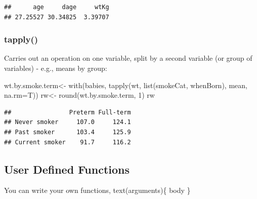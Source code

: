 \documentclass[
]{book}
\newenvironment{Shaded}{\begin{snugshade}}{\end{snugshade}}
\newcommand{\AttributeTok}[1]{\textcolor[rgb]{0.77,0.63,0.00}{#1}}
\newcommand{\ControlFlowTok}[1]{\textcolor[rgb]{0.13,0.29,0.53}{\textbf{#1}}}
\newcommand{\DecValTok}[1]{\textcolor[rgb]{0.00,0.00,0.81}{#1}}
\newcommand{\FunctionTok}[1]{\textcolor[rgb]{0.00,0.00,0.00}{#1}}
\newcommand{\NormalTok}[1]{#1}
\newcommand{\OtherTok}[1]{\textcolor[rgb]{0.56,0.35,0.01}{#1}}
\newcommand{\SpecialCharTok}[1]{\textcolor[rgb]{0.00,0.00,0.00}{#1}}
\newcommand{\StringTok}[1]{\textcolor[rgb]{0.31,0.60,0.02}{#1}}
\begin{document}
\begin{verbatim}
##      age     dage     wtKg 
## 27.25527 30.34825  3.39707
\end{verbatim}

\hypertarget{tapply}{%
\subsubsection*{tapply()}\label{tapply}}

Carries out an operation on one variable, split by a second variable (or group of variables) - e.g., means by group:

\begin{Shaded}
\begin{Highlighting}[]
\NormalTok{wt.by.smoke.term}\OtherTok{\textless{}{-}} \FunctionTok{with}\NormalTok{(babies, }
                       \FunctionTok{tapply}\NormalTok{(wt, }\FunctionTok{list}\NormalTok{(smokeCat, whenBorn), mean, }\AttributeTok{na.rm=}\NormalTok{T))}
\NormalTok{rw}\OtherTok{\textless{}{-}} \FunctionTok{round}\NormalTok{(wt.by.smoke.term, }\DecValTok{1}\NormalTok{)}
\NormalTok{rw}
\end{Highlighting}
\end{Shaded}

\begin{verbatim}
##                Preterm Full-term
## Never smoker     107.0     124.1
## Past smoker      103.4     125.9
## Current smoker    91.7     116.2
\end{verbatim}

\hypertarget{user-defined-functions}{%
\subsection*{User Defined Functions}\label{user-defined-functions}}

You can write your own functions, text(arguments)\{ body \}

\begin{Shaded}
\end{Shaded}
\end{document}
